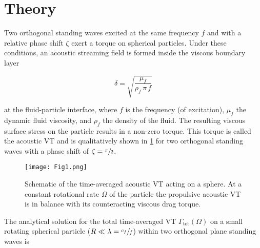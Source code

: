 \section{Theory \label{sec:VT-theory}}

Two orthogonal standing waves excited at the same frequency $f$ and with a 
relative phase shift $\zeta$ exert a torque on spherical particles. Under these 
conditions, an acoustic streaming field is formed inside the viscous boundary 
layer

\begin{equation}
    \delta = \sqrt{\frac{\mu_{f}}{\rho_{f}\,\pi\,f}}
    \label{eq:VT-delta}
\end{equation}

at the fluid-particle interface, where $f$ is the frequency (of excitation), 
$\mu_{f}$ the dynamic fluid viscosity, and $\rho_{f}$ the density of the fluid. 
The resulting viscous surface stress on the particle results in a non-zero 
torque. This torque is called the acoustic VT and is qualitatively shown in 
\cref{fig:Fig1} for two orthogonal standing waves with a phase shift of $\zeta = 
\sfrac{\pi}{2}$.

\begin{figure}
    \centering
    \texttt{[image: Fig1.png]}
    \caption{Schematic of the time-averaged acoustic VT acting on a sphere. At a 
    constant rotational rate $\Omega$ of the particle the propulsive acoustic VT 
is in balance with its counteracting viscous drag torque.\label{fig:Fig1}}
\end{figure}%

The analytical solution for the total time-averaged VT 
$\Gamma_{\text{tot}}(\Omega)$ on a small rotating spherical particle 
($R\ll\lambda=\sfrac{c_f}{f}$) within two orthogonal plane standing waves is 

